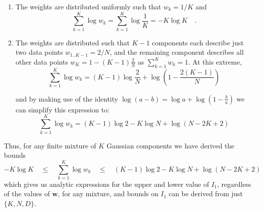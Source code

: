 \documentclass{elsarticle}
\newcommand{\vect}[1]{\boldsymbol{\mathbf{#1}}}
\renewcommand{\vec}[1]{\vect{#1}}
\def\weight{w}
\begin{document}
\begin{enumerate}
    \item The weights are distributed uniformly such that $w_k = 1/K$ and
          \begin{equation}
                \sum_{k=1}^{K}\log\weight_k = \sum_{k=1}^{K}\log{\frac{1}{K}} =-K\log{K} \quad .
          \end{equation}
    \item The weights are distributed such that $K - 1$ components each 
          describe just two data points $w_{1..K-1} = 2/N$, and the remaining 
          component describes all other data points $w_{K} = 1 - (K-1)\frac{2}{N}$
          as $\sum_{k=1}^{K}\weight_k = 1$. At this extreme,
          \begin{equation}
            \sum_{k=1}^{K}\log\weight_k = (K - 1)\log\frac{2}{N} + \log\left(1 - \frac{2(K - 1)}{N}\right)
          \end{equation}

          \noindent{}and by making use of the identity 
            $\log{(a-b)} = \log{a} + \log{(1 - \frac{b}{a})}$
          we can simplify this expression to:
          \begin{equation}
            \sum_{k=1}^{K}\log\weight_k = (K - 1)\log{2} - K\log{N} + \log{(N - 2K + 2)}
          \end{equation}
\end{enumerate}

\noindent{}Thus, for any finite mixture of $K$ Gaussian components we have 
derived the bounds
\begin{equation}
-K\log{K} \quad \leq \quad \sum_{k=1}^{K}\log\weight_k \quad \leq \quad (K - 1)\log{2} - K\log{N} + \log{(N - 2K + 2)}
\end{equation}
\noindent{}which gives us analytic expressions for the upper and lower value 
of $I_1$, regardless of the values of $\vec{\weight}$, for any mixture, and
bounds on $I_{1}$ can be derived from just $\{K, N, D\}$.
\end{document}
